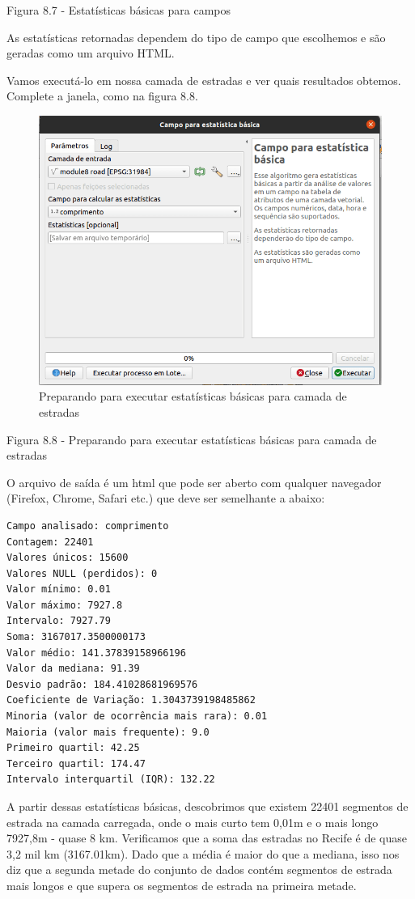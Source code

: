 \documentclass[
]{krantz}
\begin{document}
Figura 8.7 - Estatísticas básicas para campos

As estatísticas retornadas dependem do tipo de campo que escolhemos e são geradas como um arquivo HTML.

Vamos executá-lo em nossa camada de estradas e ver quais resultados obtemos. Complete a janela, como na figura 8.8.

\begin{figure}
\centering
\includegraphics{media/modulo8/fig88.png}
\caption{Preparando para executar estatísticas básicas para camada de estradas}
\end{figure}

Figura 8.8 - Preparando para executar estatísticas básicas para camada de estradas

O arquivo de saída é um html que pode ser aberto com qualquer navegador (Firefox, Chrome, Safari etc.) que deve ser semelhante a abaixo:

\begin{verbatim}
Campo analisado: comprimento
Contagem: 22401
Valores únicos: 15600
Valores NULL (perdidos): 0
Valor mínimo: 0.01
Valor máximo: 7927.8
Intervalo: 7927.79
Soma: 3167017.3500000173
Valor médio: 141.37839158966196
Valor da mediana: 91.39
Desvio padrão: 184.41028681969576
Coeficiente de Variação: 1.3043739198485862
Minoria (valor de ocorrência mais rara): 0.01
Maioria (valor mais frequente): 9.0
Primeiro quartil: 42.25
Terceiro quartil: 174.47
Intervalo interquartil (IQR): 132.22
\end{verbatim}

A partir dessas estatísticas básicas, descobrimos que existem 22401 segmentos de estrada na camada carregada, onde o mais curto tem 0,01m e o mais longo 7927,8m - quase 8 km. Verificamos que a soma das estradas no Recife é de quase 3,2 mil km (3167.01km). Dado que a média é maior do que a mediana, isso nos diz que a segunda metade do conjunto de dados contém segmentos de estrada mais longos e que supera os segmentos de estrada na primeira metade.
\end{document}
